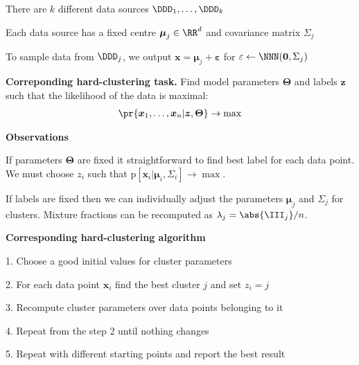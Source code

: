 \documentclass[landscape,footrule]{foils}
\newcommand{\pd}[1]{\mathrm{p}[#1]}
\renewcommand{\vec}[1]{\boldsymbol{#1}}
\begin{document}

\begin{triangles}
\item There are $k$ different data sources $\DDD_1,\ldots,\DDD_k$
\item Each data source has a fixed centre $\vec{\mu}_j\in\RR^d$ and covariance matrix $\Sigma_j$
\item To sample data from  $\DDD_j$, we output $\vec{x}=\vec{\mu}_j+\vec{\varepsilon}$ for $\varepsilon\gets\NNN(\vec{0},\Sigma_j)$ 
\end{triangles}

\vspace*{1cm}


\textbf{Correponding hard-clustering task.} Find model parameters $\vec{\Theta}$ and labels $\vec{z}$ such that the likelihood of the data is maximal:
\begin{align*}
\pr{\vec{x}_1,\ldots,\vec{x}_n|\vec{z},\vec{\Theta}}\to \max
\end{align*}



\textbf{Observations} 
\begin{triangles}
\item If parameters $\vec{\Theta}$ are fixed it straightforward to find best label for each data point. We must choose $z_i$ such that $\pd{\vec{x}_i|\vec{\mu}_i,\Sigma_i}\to \max$.
\item If labels are fixed then we can individually adjust the parameters $\vec{\mu}_j$ and $\Sigma_j$ for clusters. Mixture fractions can be recomputed as $\lambda_j=\abs{\III_j}/n$.
\end{triangles}

\vspace*{0.5cm}


\textbf{Corresponding hard-clustering algorithm}
\begin{triangles}
\item[1.] Choose a good initial values for cluster parameters
\item[2.] For each data point $\vec{x}_i$ find the best cluster $j$ and set $z_i=j$
\item[3.] Recompute cluster parameters over data points belonging to it
\item[4.] Repeat from the step 2 until nothing changes
\item[5.] Repeat with different starting points and report the best result   
\end{triangles}
\vspace*{-0.5cm}
\end{document}
